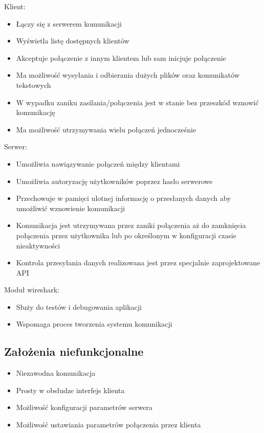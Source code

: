\documentclass{article}
\begin{document}
Klient:
\begin{itemize}
\item Łączy się z serwerem komunikacji
\item Wyświetla listę dostępnych klientów
\item Akceptuje połączenie z innym klientem lub sam inicjuje połączenie
\item Ma możliwość wysyłania i odbierania dużych plików oraz komunikatów tekstowych
\item W wypadku zaniku zasilania/połączenia jest w stanie bez przeszkód wznowić komunikację
\item Ma możliwość utrzymywania wielu połączeń jednocześnie
\end{itemize}
Serwer:
\begin{itemize}
\item Umożliwia nawiązywanie połączeń między klientami
\item Umożliwia autoryzację użytkowników poprzez hasło serwerowe
\item Przechowuje w pamięci ulotnej informację o przesłanych danych aby umożliwić wznowienie komunikacji
\item Komunikacja jest utrzymywana przez zaniki połączenia aż do zamknięcia połączenia przez użytkownika lub po określonym w konfiguracji czasie nieaktywności
\item Kontrola przesyłania danych realizowana jest przez specjalnie zaprojektowane API
\end{itemize}
Moduł wireshark:
\begin{itemize}
\item Służy do testów i debugowania aplikacji
\item Wspomaga proces tworzenia systemu komunikacji
\end{itemize}

\subsection{Założenia niefunkcjonalne}

\begin{itemize}
\item Niezawodna komunikacja
\item Prosty w obsłudze interfejs klienta
\item Możliwość konfiguracji parametrów serwera
\item Możliwość ustawiania parametrów połączenia przez klienta
\end{itemize}
\end{document}
